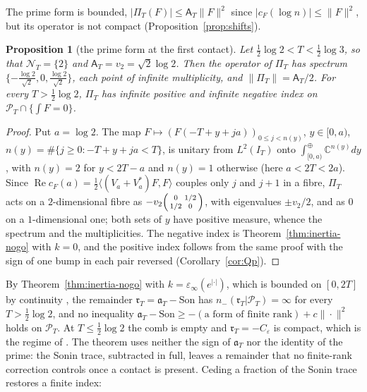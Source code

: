 \documentclass[11pt]{amsart}
\newtheorem{proposition}[theorem]{Proposition}
\theoremstyle{definition}
\theoremstyle{remark}
\newcommand{\C}{\mathbb C}
\newcommand{\Rel}{\operatorname{Re}}
\newcommand{\PT}{\mathcal P_T}
\newcommand{\IT}{I_T}
\newcommand{\cF}{c_F}
\newcommand{\NT}{\mathcal N_T}
\newcommand{\Aconst}{\mathsf A_T}
\newcommand{\PiT}{\Pi_T}
\begin{document}
The prime form is bounded, $|\PiT(F)|\le\Aconst\|F\|^2$ since $|\cF(\log n)|\le\|F\|^2$, but its operator is not compact
(Proposition~\ref{prop:shifts}).

\begin{proposition}[the prime form at the first contact]\label{thm:inertia-B2}
Let $\frac12\log2<T<\frac12\log3$, so that $\NT=\{2\}$ and $\Aconst=v_2=\sqrt2\log2$. Then the operator of $\PiT$ has
spectrum $\{-\frac{\log2}{\sqrt2},0,\frac{\log2}{\sqrt2}\}$, each point of infinite multiplicity, and
$\|\PiT\|=\Aconst/2$. For every $T>\frac12\log2$, $\PiT$ has infinite positive and infinite negative index on
$\PT\cap\{\int F=0\}$.
\end{proposition}
\begin{proof}
Put $a=\log2$. The map $F\mapsto(F(-T+y+ja))_{0\le j<n(y)}$, $y\in[0,a)$, $n(y)=\#\{j\ge0:-T+y+ja<T\}$, is unitary from
$L^2(\IT)$ onto $\int^\oplus_{[0,a)}\C^{n(y)}dy$, with $n(y)=2$ for $y<2T-a$ and $n(y)=1$ otherwise (here $a<2T<2a$).
Since $\Rel\cF(a)=\frac12\langle(V_a+V_a^*)F,F\rangle$ couples only $j$ and $j+1$ in a fibre, $\PiT$ acts on a
$2$-dimensional fibre as $-v_2\begin{psmallmatrix}0&1/2\\1/2&0\end{psmallmatrix}$, with eigenvalues $\pm v_2/2$, and as $0$ on a
$1$-dimensional one; both sets of $y$ have positive measure, whence the spectrum and the multiplicities. The
negative index is Theorem~\ref{thm:inertia-nogo} with $k=0$, and the positive index follows from the same proof
with the sign of one bump in each pair reversed (Corollary~\ref{cor:Qp}).
\end{proof}

By Theorem~\ref{thm:inertia-nogo} with $k=\varepsilon_\infty(e^{|\cdot|})$, which is bounded on $[0,2T]$ by continuity
\cite[(84)]{ConnesConsani2021}, the remainder $\mathfrak r_T=\mathfrak a_T-\mathrm{Son}$ has $n_-(\mathfrak r_T|\PT)=\infty$ for every
$T>\frac12\log2$, and no inequality $\mathfrak a_T-\mathrm{Son}\ge-(\text{a form of finite rank})+c\|\cdot\|^2$ holds on $\PT$. At
$T\le\frac12\log2$ the comb is empty and $\mathfrak r_T=-C_\varepsilon$ is compact, which is the regime of
\cite[\S6]{ConnesConsani2021}. The theorem uses neither the sign of $\mathfrak a_T$ nor the identity of the prime: the
Sonin trace, subtracted in full, leaves a remainder that no finite-rank correction controls once a contact is
present. Ceding a fraction of the Sonin trace restores a finite index:
\end{document}
